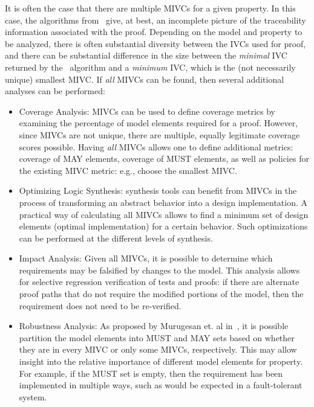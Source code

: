 It is often the case that there are multiple MIVCs for a given property.  In this case, the algorithms from~\cite{Ghass16} give, at best, an
incomplete picture of the traceability information associated with the proof.  Depending on the model and property to be analyzed, there is often substantial diversity between the IVCs used for proof, and there can be substantial difference in the size between the {\em minimal} IVC returned by the \ucbfalg\ algorithm and a {\em minimum} IVC, which is the (not necessarily unique) smallest MIVC.
 If {\em all} MIVCs can be found, then several additional analyses can be performed:
\begin{itemize}
    \item Coverage Analysis: MIVCs can be used to define coverage metrics by examining the percentage of model elements required for a proof.  However, since MIVCs are not unique, there are multiple, equally legitimate coverage scores possible.  Having \emph{all} MIVCs allows one to define additional metrics: coverage of MAY elements, coverage of MUST elements, as well as policies for the existing MIVC metric: e.g., choose the smallest MIVC. %
    \item Optimizing Logic Synthesis:  synthesis tools can benefit from MIVCs in the process of transforming an abstract behavior into a design implementation. A practical way of calculating all MIVCs allows to find a minimum set of design elements (optimal implementation) for a certain behavior. Such optimizations can be performed at the different levels of synthesis.
    \item Impact Analysis: Given all MIVCs, it is possible to determine which requirements may be falsified by changes to the model.  This analysis allows for selective regression verification of tests and proofs: if there are alternate proof paths that do not require the modified portions of the model, then the requirement does not need to be re-verified.
    \item Robustness Analysis: As proposed by Murugesan et. al in~\cite{Murugesan16:renext}, it is possible partition the model elements into MUST and MAY sets based on whether they are in every MIVC or only some MIVCs, respectively.  This may allow insight into the relative importance of different model elements for property.  For example, if the MUST set is empty, then the requirement has been implemented in multiple ways, such as would be expected in a fault-tolerant system.
\end{itemize}

